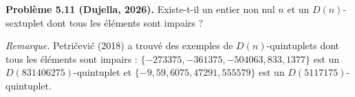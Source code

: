 \textbf{Problème 5.11 (Dujella, 2026).} Existe-t-il un entier non nul $n$ et un $D(n)$-sextuplet dont tous les éléments sont impairs ?

\medskip

\textit{Remarque.} Petričević (2018) a trouvé des exemples de $D(n)$-quintuplets dont tous les éléments sont impairs : $\{-273375,-361375,-504063,833,1377\}$ est un $D(831406275)$-quintuplet et $\{-9,59,6075,47291,555579\}$ est un $D(5117175)$-quintuplet.

